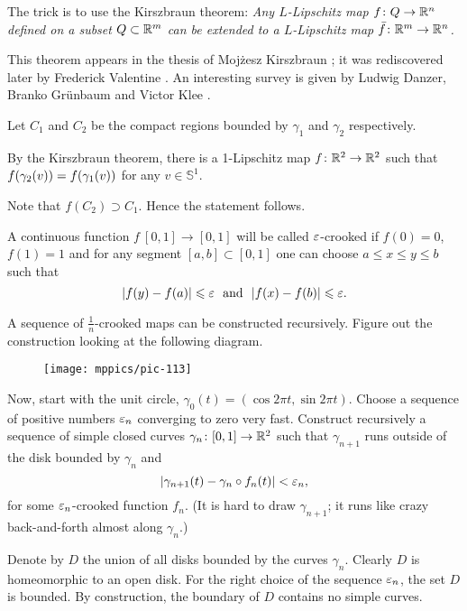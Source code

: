  The trick is to use the Kirszbraun theorem:
\emph{Any $L$-Lipschitz  map $f\colon Q\to \mathbb{R}^n$ defined on a subset $Q\subset \mathbb{R}^m$ can be extended to a $L$-Lipschitz  map $\bar f\colon\mathbb{R}^m\to \mathbb{R}^n$.}

This theorem  appears in the thesis of Mojżesz Kirszbraun \cite[][]{kirszbraun};
it was rediscovered later by Frederick Valentine \cite[][]{valentine}.
An interesting survey is given by 
Ludwig Danzer, Branko Gr{\"u}nbaum and Victor Klee \cite[][]{danzer-grunbaum-klee}.

\medskip

Let $C_1$ and $C_2$ be the compact regions bounded by $\gamma_1$ and $\gamma_2$ respectively.

By the Kirszbraun theorem, there is a 1-Lipschitz map $f\colon\mathbb{R}^2\to\mathbb{R}^2$ 
such that $f(\gamma_2(v))\z=f(\gamma_1(v))$ for any $v\in\mathbb S^1$.

Note that $f(C_2)\supset C_1$.
Hence the statement follows.\qeds

A continuous function $f\:[0,1]\to [0,1]$
will be called $\varepsilon$-crooked 
if $f(0)=0$, $f(1)=1$ 
and for any segment $[a,b]\subset [0,1]$ 
one can choose $a\le x\le y\le b$ 
such that
\[|f(y)-f(a)|\le\eps\ \ \text{and}\ \ |f(x)-f(b)|\le\eps.\]

A sequence of $\tfrac1n$-crooked maps can be constructed recursively. 
Figure out the construction looking at the following diagram.

\begin{figure}[h!]
\centering
\texttt{[image: mppics/pic-113]}
\end{figure}

Now, start with the unit circle, 
$\gamma_0(t)=(\cos 2\pi t,\sin 2 \pi t)$.
Choose a sequence of positive numbers $\varepsilon_n$ converging to zero very fast. 
Construct recursively a sequence of simple closed curves $\gamma_n\:[0,1]\z\to\RR^2$ such that $\gamma_{n+1}$ runs outside of the disk bounded by $\gamma_n$
and 
\[|\gamma_{n+1}(t)-\gamma_n\circ f_n(t)|<\varepsilon_n,\]
for some $\varepsilon_n$-crooked function $f_n$.
(It is hard to draw $\gamma_{n+1}$; it runs like crazy back-and-forth almost along $\gamma_n$.)

Denote by $D$ the union of all disks bounded by the curves $\gamma_n$.
Clearly $D$ is homeomorphic to an open disk.
For the right choice of the sequence $\varepsilon_n$, 
the set $D$ is bounded.
By construction, the boundary of $D$ contains no simple curves. \qeds

